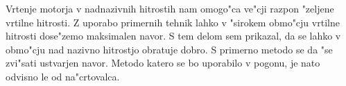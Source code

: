 \documentclass[journal,a4paper,twoside]{sty/IEEEtran}
\begin{document}
Vrtenje motorja v nadnazivnih hitrostih nam omogo"ca ve"cji razpon "zeljene vrtilne hitrosti. Z uporabo primernih tehnik lahko v "sirokem obmo"cju vrtilne hitrosti dose"zemo maksimalen navor. S tem delom sem prikazal, da se lahko v obmo"cju nad nazivno hitrostjo obratuje dobro. S primerno metodo se da "se zvi"sati ustvarjen navor. Metodo katero se bo uporabilo v pogonu, je nato odvisno le od na"crtovalca.



%
%
%
%
%
%
\end{document}

